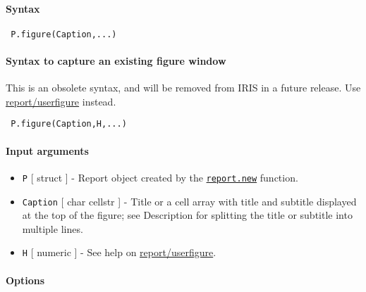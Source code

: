 


	\paragraph{Syntax}
 
 \begin{verbatim}
 P.figure(Caption,...)
 \end{verbatim}
 
 \paragraph{Syntax to capture an existing figure window}
 
 This is an obsolete syntax, and will be removed from IRIS in a future
 release. Use \url{report/userfigure} instead.
 
 \begin{verbatim}
 P.figure(Caption,H,...)
 \end{verbatim}
 
 \paragraph{Input arguments}
 
 \begin{itemize}
 \item
   \texttt{P} {[} struct {]} - Report object created by the
   \href{report/new}{\texttt{report.new}} function.
 \item
   \texttt{Caption} {[} char \textbar{} cellstr {]} - Title or a cell
   array with title and subtitle displayed at the top of the figure; see
   Description for splitting the title or subtitle into multiple lines.
 \item
   \texttt{H} {[} numeric {]} - See help on \url{report/userfigure}.
 \end{itemize}
 
 \paragraph{Options}
 
